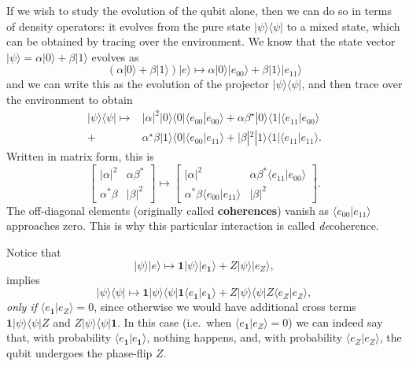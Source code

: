 \documentclass[fleqn,a4paper]{article}
\theoremstyle{definition}
\theoremstyle{definition}
\theoremstyle{definition}
\theoremstyle{definition}
\theoremstyle{remark}
\begin{document}
If we wish to study the evolution of the qubit alone, then we can do so in terms of density operators: it evolves from the pure state \(|\psi\rangle\langle\psi|\) to a mixed state, which can be obtained by tracing over the environment.
We know that the state vector \(|\psi\rangle=\alpha|0\rangle+\beta|1\rangle\) evolves as
\[
  \left( \alpha|0\rangle +\beta |1\rangle\right)|e\rangle \longmapsto
  \alpha |0\rangle|e_{00}\rangle +\beta |1\rangle |e_{11}\rangle
\]
and we can write this as the evolution of the projector \(|\psi\rangle\langle\psi|\), and then trace over the environment to obtain
\[
  \begin{aligned}
    |\psi\rangle\langle\psi| \longmapsto & |\alpha|^2|0\rangle\langle 0| \langle e_{00}|e_{00}\rangle+ \alpha\beta^\star |0\rangle\langle 1|\langle e_{11}|e_{00}\rangle
  \\+ &\alpha^\star\beta |1\rangle\langle 0|\langle e_{00}|e_{11}\rangle  + |\beta|^2|1\rangle\langle 1|\langle e_{11}|e_{11}\rangle.
  \end{aligned}
\]
Written in matrix form, this is
\[
  \begin{bmatrix}
    |\alpha|^2 & \alpha\beta^\ast
  \\\alpha^\ast\beta & |\beta|^2
  \end{bmatrix}
  \longmapsto
  \begin{bmatrix}
    |\alpha|^2 & \alpha\beta^\ast \langle e_{11}|e_{00}\rangle
    \\\alpha^\ast\beta \langle e_{00}|e_{11}\rangle & |\beta|^2
  \end{bmatrix}.
\]
The off-diagonal elements (originally called \textbf{coherences}) vanish as \(\langle e_{00}|e_{11}\rangle\) approaches zero.
This is why this particular interaction is called \emph{de}coherence.

Notice that
\[
|\psi\rangle|e\rangle \longmapsto \mathbf{1}|\psi\rangle|e_{\mathbf{1}}\rangle+Z|\psi\rangle|e_Z\rangle,
\]
implies
\[
|\psi\rangle\langle\psi|\longmapsto \mathbf{1}|\psi\rangle\langle\psi| \mathbf{1}\langle e_{\mathbf{1}}|e_{\mathbf{1}}\rangle +Z|\psi\rangle\langle\psi| Z\langle e_Z|e_Z\rangle,
\]
\emph{only if} \(\langle e_{\mathbf{1}}|e_Z\rangle=0\), since otherwise we would have additional cross terms \(\mathbf{1}|\psi\rangle\langle\psi|Z\) and \(Z|\psi\rangle\langle\psi|\mathbf{1}\).
In this case (i.e.~when \(\langle e_{\mathbf{1}}|e_Z\rangle=0\)) we can indeed say that, with probability \(\langle e_{\mathbf{1}}|e_{\mathbf{1}}\rangle\), nothing happens, and, with probability \(\langle e_Z|e_Z\rangle\), the qubit undergoes the phase-flip \(Z\).
\end{document}
